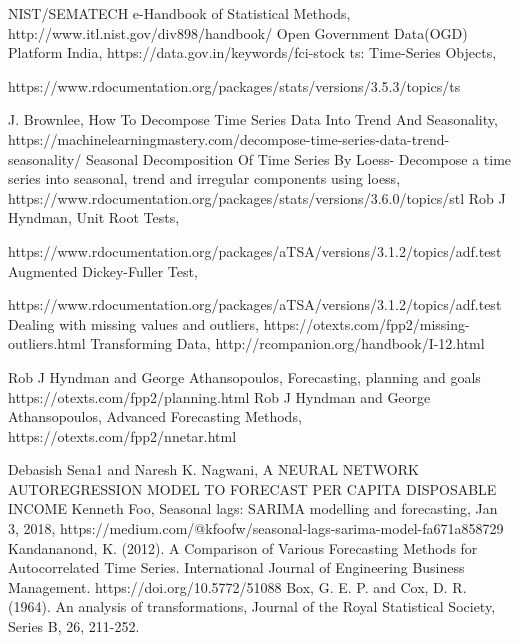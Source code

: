 \documentclass[runningheads]{llncs}
\begin{document}
\begin{thebibliography}{8}
 NIST/SEMATECH e-Handbook of Statistical Methods, http://www.itl.nist.gov/div898/handbook/
 Open Government Data(OGD) Platform India,
https://data.gov.in/keywords/fci-stock
 ts: Time-Series Objects,

https://www.rdocumentation.org/packages/stats/versions/3.5.3/topics/ts

 J. Brownlee, How To Decompose Time Series Data Into Trend And Seasonality,
https://machinelearningmastery.com/decompose-time-series-data-trend-seasonality/
 Seasonal Decomposition Of Time Series By Loess-
Decompose a time series into seasonal, trend and irregular components using loess,
https://www.rdocumentation.org/packages/stats/versions/3.6.0/topics/stl
 Rob J Hyndman, Unit Root Tests,

https://www.rdocumentation.org/packages/aTSA/versions/3.1.2/topics/adf.test
Augmented Dickey-Fuller Test,

https://www.rdocumentation.org/packages/aTSA/versions/3.1.2/topics/adf.test
 Dealing with missing values and outliers,
https://otexts.com/fpp2/missing-outliers.html
 Transforming Data,
http://rcompanion.org/handbook/I-12.html

Rob J Hyndman and George Athansopoulos, Forecasting, planning and goals
https://otexts.com/fpp2/planning.html 
 Rob J Hyndman and George Athansopoulos, Advanced Forecasting Methods,
https://otexts.com/fpp2/nnetar.html

 Debasish Sena1
 and Naresh K. Nagwani, A NEURAL NETWORK AUTOREGRESSION MODEL TO FORECAST
PER CAPITA DISPOSABLE INCOME 
 Kenneth Foo, Seasonal lags: SARIMA modelling and forecasting, Jan 3, 2018, 
https://medium.com/@kfoofw/seasonal-lags-sarima-model-fa671a858729
  Kandananond, K. (2012). A Comparison of Various Forecasting Methods for Autocorrelated Time Series. International Journal of Engineering Business Management. https://doi.org/10.5772/51088
 Box, G. E. P. and Cox, D. R. (1964). An analysis of transformations, Journal of the Royal Statistical Society, Series B, 26, 211-252.
\end{thebibliography}
\end{document}
